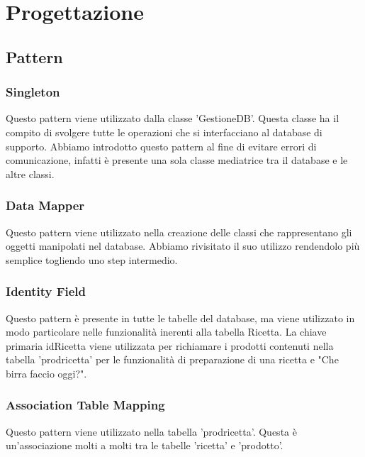 \documentclass[a4paper, titlepage]{article}
\begin{document}
\newpage

\section{Progettazione}
\subsection{Pattern}
\subsubsection{Singleton}
Questo pattern viene utilizzato dalla classe 'GestioneDB'. Questa classe ha il compito di svolgere tutte le operazioni che si interfacciano al database di supporto. Abbiamo introdotto questo pattern al fine di evitare errori di comunicazione, infatti è presente una sola classe mediatrice tra il database e le altre classi.
\subsubsection{Data Mapper}
Questo pattern viene utilizzato nella creazione delle classi che rappresentano gli oggetti manipolati nel database.
Abbiamo rivisitato il suo utilizzo rendendolo più semplice togliendo uno step intermedio.
\subsubsection{Identity Field}
Questo pattern è presente in tutte le tabelle del database, ma viene utilizzato in modo particolare nelle funzionalità inerenti alla tabella Ricetta.
La chiave primaria idRicetta viene utilizzata per richiamare i prodotti contenuti nella tabella 'prodricetta' per le funzionalità di preparazione di una ricetta e "Che birra faccio oggi?".
\subsubsection{Association Table Mapping}
Questo pattern viene utilizzato nella tabella 'prodricetta'. Questa è un'associazione molti a molti tra le tabelle 'ricetta' e 'prodotto'.
\end{document}
